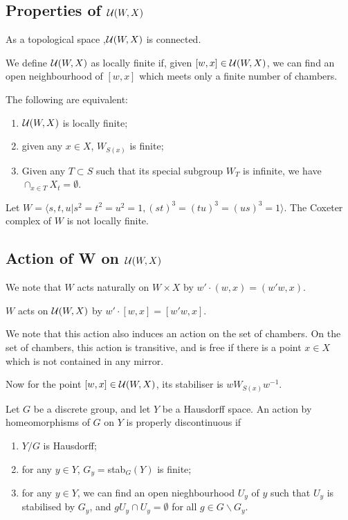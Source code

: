 \documentclass[12pt]{article}
\begin{document}
\subsection{Properties of $\mathcal{U}(W,X)$}
\begin{lemma}
    As a topological space ,$\mathcal{U}(W,X)$ is connected.
\end{lemma}

\begin{definition}
    We define  $\mathcal{U}(W,X)$ as locally finite if, given $[w,x]\in\mathcal{U}(W,X)$, we can find an open neighbourhood of $[w,x]$ which meets only a finite number of chambers.
\end{definition}

\begin{lemma}
    The following are equivalent:
    \begin{enumerate}
        \item $\mathcal{U}(W,X)$ is locally finite;
        \item given any $x\in X$, $W_{S(x)}$ is finite;
        \item Given any $T\subset S$ such that its special subgroup $W_T$ is infinite, we have $\cap_{x\in T}X_t=\emptyset.$
    \end{enumerate}
\end{lemma}

\begin{example}
    Let $W=\langle s,t,u|s^2=t^2=u^2=1,(st)^3=(tu)^3=(us)^3=1\rangle$. The Coxeter complex of $W$ is not locally finite. 
\end{example}


\subsection{Action of W on $\mathcal{U}(W,X)$}

We note that $W$ acts naturally on $W\times X$ by $w'\cdot(w,x)=(w'w,x)$. 

\begin{lemma}
    $W$ acts on $\mathcal{U}(W,X)$ by $w'\cdot[w,x]=[w'w,x].$
\end{lemma}

We note that this action also induces an action on the set of chambers. On the set of chambers, this action is transitive, and is free if there is a point $x\in X$ which is not contained in any mirror. 

Now for the point $[w,x]\in\mathcal{U}(W,X)$, its stabiliser is $wW_{S(x)}w^{-1}$. 

\begin{definition}
    Let $G$ be a discrete group, and let $Y$ be a Hausdorff space. An action by homeomorphisms of $G$ on $Y$ is properly discontinuous if 
    \begin{enumerate}
        \item $Y/G$ is Hausdorff;
        \item for any $y\in Y$, $G_y=$stab$_G(Y)$ is finite;
        \item for any $y\in Y$, we can find an open nieghbourhood $U_y$ of $y$ such that $U_y$ is stabilised by $G_y$, and $gU_y\cap U_y=\emptyset$ for all $g\in G\backslash G_y$. 
    \end{enumerate}
\end{definition}
\end{document}
